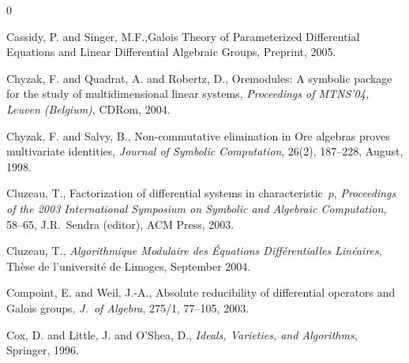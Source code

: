 \begin{thebibliography}{0}


Cassidy, P. and Singer, M.F.,Galois Theory of Parameterized
Differential Equations and Linear Differential Algebraic Groups,
Preprint, 2005.


Chyzak, F. and Quadrat, A. and Robertz, D., {\sc Oremodules}: {A}
symbolic package for the study of multidimensional linear systems,
{\em Proceedings of MTNS'04, Leuven (Belgium)},  CDRom, 2004.


Chyzak, F. and Salvy, B., Non-commutative elimination in {O}re
algebras proves multivariate identities, {\em Journal of Symbolic
Computation},  26(2), 187--228, August, 1998.

Cluzeau, T., Factorization of differential systems in
characteristic~$p$, {\em Proceedings of the 2003 International
Symposium on Symbolic and Algebraic Computation}, 58--65,
J.R.~Sendra (editor), ACM Press, 2003.

Cluzeau, T., {\em Algorithmique Modulaire des {\'E}quations
Diff{\'e}rentialles Lin{\'e}aires},
 Th{\`e}se de l'universit{\'e} de Limoges, September 2004.






Compoint, E. and Weil, J.-A., Absolute reducibility of
differential operators and {G}alois groups,  {\em J.~of Algebra},
 275/1,  77--105, 2003.


Cox, D. and Little, J. and O'Shea, D., {\em Ideals, Varieties, and
Algorithms}, Springer, 1996.



\end{thebibliography}
